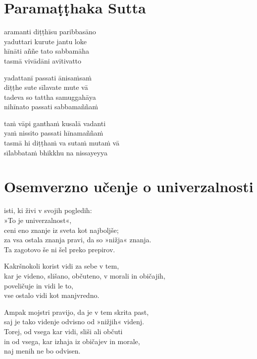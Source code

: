 

\cleartoverso
\chapter*{Paramaṭṭhaka Sutta}

aramanti diṭṭhīsu paribbasāno\\
yaduttari kurute jantu loke\\
hīnāti aññe tato sabbamāha\\
tasmā vivādāni avītivatto

yadattanī passati ānisaṁsaṁ\\
diṭṭhe sute sīlavate mute vā\\
tadeva so tattha samuggahāya\\
nihīnato passati sabbamaññaṁ

taṁ vāpi ganthaṁ kusalā vadanti\\
yaṁ nissito passati hīnamaññaṁ\\
tasmā hi diṭṭhaṁ va sutaṁ mutaṁ vā\\
sīlabbataṁ bhikkhu na nissayeyya


\cleartorecto
\chapter{Osemverzno učenje o univerzalnosti}

isti, ki živi v svojih pogledih:\\
»To je univerzalnost«,\\
ceni eno znanje iz sveta kot najboljše;\\
za vsa ostala znanja pravi, da so »nižja« znanja.\\
Ta zagotovo še ni šel preko prepirov.

Kakršnokoli korist vidi za sebe v tem,\\
kar je videno, slišano, občuteno, v morali in običajih,\\
poveličuje in vidi le to,\\
vse ostalo vidi kot manjvredno.

Ampak mojstri pravijo, da je v tem skrita past,\\
saj je tako videnje odvisno od »nižjih« videnj.\\
Torej, od vsega kar vidi, sliši ali občuti\\
in od vsega, kar izhaja iz običajev in morale,\\\vin naj menih ne bo odvisen.

